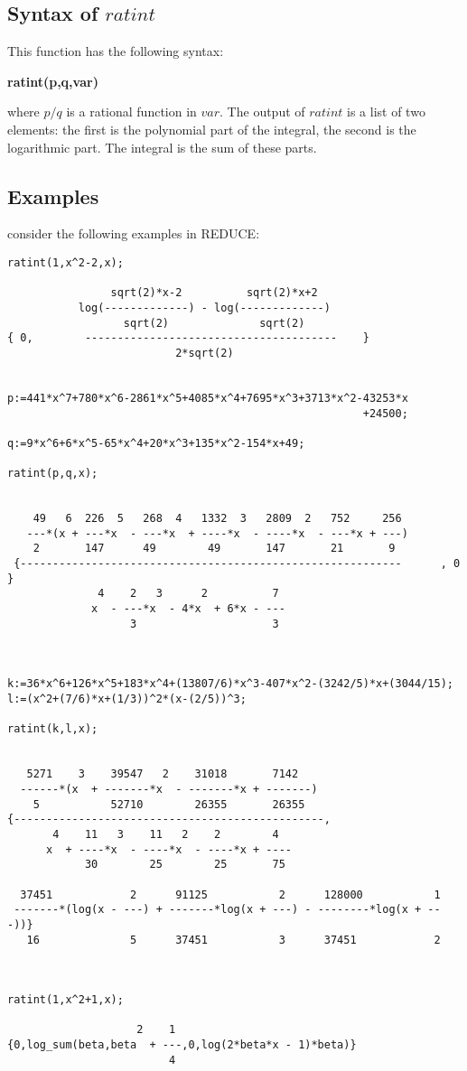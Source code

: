 \subsection{Syntax of $ratint$}
This function has the following syntax:
\begin{center} \bf{ratint(p,q,var)} \end{center}
where $ p/q$ is a rational function in $var$. The output of $ratint$ is a list of two elements: the first is the polynomial part of the integral, the second is the logarithmic part. The integral is the sum of these parts.
\subsection{Examples}
consider the following examples in \small{REDUCE}:
\begin{verbatim}
ratint(1,x^2-2,x);

                sqrt(2)*x-2          sqrt(2)*x+2
           log(-------------) - log(-------------)
                  sqrt(2)              sqrt(2)
{ 0,        ---------------------------------------    }
                          2*sqrt(2)
   

p:=441*x^7+780*x^6-2861*x^5+4085*x^4+7695*x^3+3713*x^2-43253*x
                                                       +24500;

q:=9*x^6+6*x^5-65*x^4+20*x^3+135*x^2-154*x+49;

ratint(p,q,x);

   
    49   6  226  5   268  4   1332  3   2809  2   752     256
   ---*(x + ---*x  - ---*x  + ----*x  - ----*x  - ---*x + ---)
    2       147      49        49       147       21       9
 {-----------------------------------------------------------      , 0  }
              4    2   3      2          7
             x  - ---*x  - 4*x  + 6*x - ---
                   3                     3

    

k:=36*x^6+126*x^5+183*x^4+(13807/6)*x^3-407*x^2-(3242/5)*x+(3044/15);
l:=(x^2+(7/6)*x+(1/3))^2*(x-(2/5))^3;

ratint(k,l,x);


   5271    3    39547   2    31018       7142
  ------*(x  + -------*x  - -------*x + -------)
    5           52710        26355       26355
{------------------------------------------------,
       4    11   3    11   2    2        4
      x  + ----*x  - ----*x  - ----*x + ----
            30        25        25       75

  37451            2      91125           2      128000           1
 -------*(log(x - ---) + -------*log(x + ---) - --------*log(x + ---))}
   16              5      37451           3      37451            2



ratint(1,x^2+1,x);

                    2    1
{0,log_sum(beta,beta  + ---,0,log(2*beta*x - 1)*beta)}
                         4

\end{verbatim}

